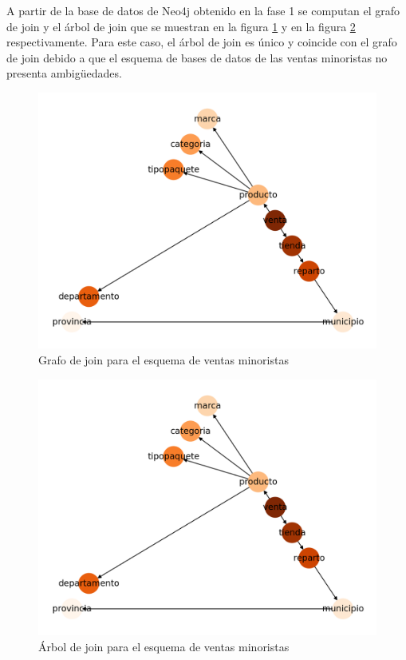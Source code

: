 A partir de la base de datos de Neo4j obtenido en la fase 1 se computan el grafo de join y el \'arbol de 
join que se muestran en la figura \ref{fig:graphjoin1} y en la figura \ref{fig:jointree1} respectivamente. Para este caso, 
el \'arbol de join es \'unico y coincide  con el grafo de join debido a que el esquema de bases de datos de 
las ventas minoristas no presenta ambigüedades.

\begin{figure}
  \centering
  \includegraphics[scale=0.6]{Graphics/joingraph1.png}
  \caption{Grafo de join para el esquema de ventas minoristas}
  \label{fig:graphjoin1}
\end{figure}

\begin{figure}
  \centering
  \includegraphics[scale=0.6]{Graphics/jointree1.png}
  \caption{\'Arbol de join para el esquema de ventas minoristas}
  \label{fig:jointree1}
\end{figure}

